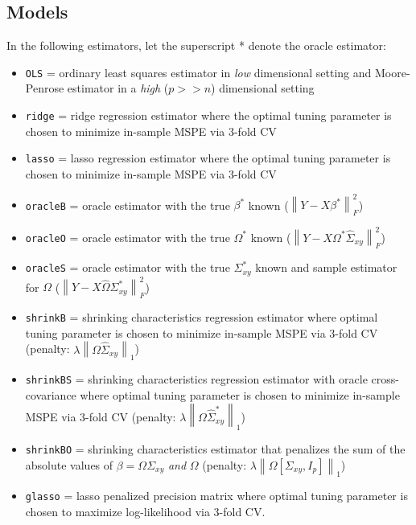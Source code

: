 \documentclass[11pt,]{report}
\begin{document}
\hypertarget{models}{%
\subsection{Models}\label{models}}

In the following estimators, let the superscript * denote the oracle estimator:

\begin{itemize}
\item
  \texttt{OLS} = ordinary least squares estimator in \emph{low} dimensional setting and Moore-Penrose estimator in a \emph{high} (\(p >> n\)) dimensional setting
\item
  \texttt{ridge} = ridge regression estimator where the optimal tuning parameter is chosen to minimize in-sample MSPE via 3-fold CV
\item
  \texttt{lasso} = lasso regression estimator where the optimal tuning parameter is chosen to minimize in-sample MSPE via 3-fold CV
\item
  \texttt{oracleB} = oracle estimator with the true \(\beta^{*}\) known (\(\left\| Y - X\beta^{*} \right\|_{F}^{2}\))
\item
  \texttt{oracleO} = oracle estimator with the true \(\Omega^{*}\) known (\(\left\| Y - X\Omega^{*}\hat{\Sigma}_{xy} \right\|_{F}^{2}\))
\item
  \texttt{oracleS} = oracle estimator with the true \(\Sigma_{xy}^{*}\) known and sample estimator for \(\Omega\) (\(\left\| Y - X\hat{\Omega}\Sigma_{xy}^{*} \right\|_{F}^{2}\))
\item
  \texttt{shrinkB} = shrinking characteristics regression estimator where optimal tuning parameter is chosen to minimize in-sample MSPE via 3-fold CV (penalty: \(\lambda\left\| \Omega\hat{\Sigma}_{xy} \right\|_{1}\))
\item
  \texttt{shrinkBS} = shrinking characteristics regression estimator with oracle cross-covariance where optimal tuning parameter is chosen to minimize in-sample MSPE via 3-fold CV (penalty: \(\lambda\left\| \Omega\hat{\Sigma}_{xy}^{*} \right\|_{1}\))
\item
  \texttt{shrinkBO} = shrinking characteristics estimator that penalizes the sum of the absolute values of \(\beta = \Omega\Sigma_{xy}\) \emph{and} \(\Omega\) (penalty: \(\lambda\left\| \Omega[\Sigma_{xy}, I_{p}] \right\|_{1}\))
\item
  \texttt{glasso} = lasso penalized precision matrix where optimal tuning parameter is chosen to maximize log-likelihood via 3-fold CV.
\end{itemize}
\end{document}
